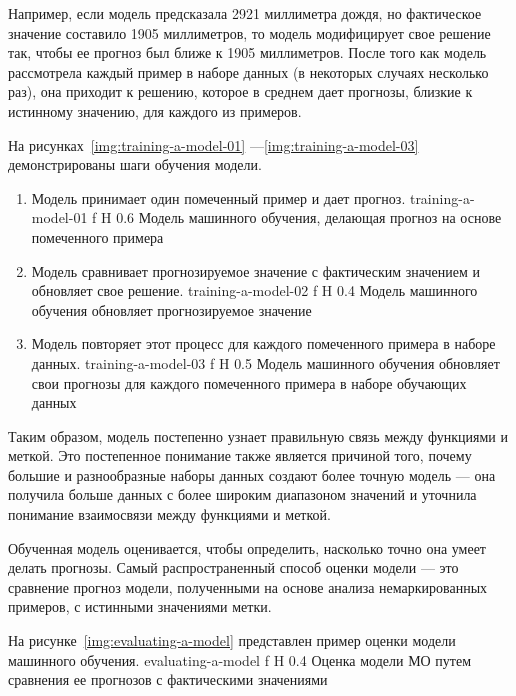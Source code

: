 Например, если модель предсказала 2921 миллиметра дождя, но фактическое значение составило 1905 миллиметров, то модель модифицирует свое решение так, чтобы ее прогноз был ближе к 1905 миллиметров.
После того как модель рассмотрела каждый пример в наборе данных (в некоторых случаях несколько раз), она приходит к решению, которое в среднем дает прогнозы, близкие к истинному значению, для каждого из примеров.

На рисунках~\ref{img:training-a-model-01} ---\ref{img:training-a-model-03} демонстрированы шаги обучения модели.
\begin{enumerate}
    \item Модель принимает один помеченный пример и дает прогноз.
    {training-a-model-01}
    {f}
    {H}
    {0.6\textwidth}
    {Модель машинного обучения, делающая прогноз на основе помеченного примера}
    \item Модель сравнивает прогнозируемое значение с фактическим значением и обновляет свое решение.
    {training-a-model-02}
    {f}
    {H}
    {0.4\textwidth}
    {Модель машинного обучения обновляет прогнозируемое значение}
    \item Модель повторяет этот процесс для каждого помеченного примера в наборе данных.
    {training-a-model-03}
    {f}
    {H}
    {0.5\textwidth}
    {Модель машинного обучения обновляет свои прогнозы для каждого помеченного примера в наборе обучающих данных}
\end{enumerate}

Таким образом, модель постепенно узнает правильную связь между функциями и меткой.
Это постепенное понимание также является причиной того, почему большие и разнообразные наборы данных создают более точную модель --- она получила больше данных с более широким диапазоном значений и уточнила понимание взаимосвязи между функциями и меткой.


Обученная модель оценивается, чтобы определить, насколько точно она умеет делать прогнозы.
Самый распространенный способ оценки модели --- это сравнение прогноз модели, полученными на основе анализа немаркированных примеров, с истинными значениями метки.

На рисунке~\ref{img:evaluating-a-model} представлен пример оценки модели машинного обучения.
    {evaluating-a-model}
    {f}
    {H}
    {0.4\textwidth}
    {Оценка модели МО путем сравнения ее прогнозов с фактическими значениями}


